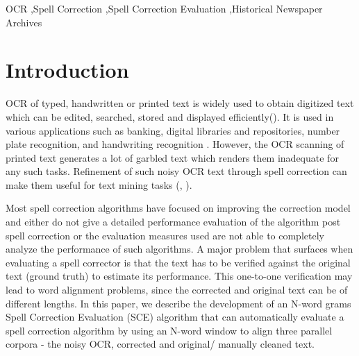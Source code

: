 \documentclass[preprint,11pt]{elsarticle}
\begin{document}
\begin{frontmatter}
\begin{abstract}
\end{abstract}

\begin{keyword}
 OCR \sep Spell Correction \sep Spell Correction Evaluation \sep Historical Newspaper Archives


\end{keyword}

\end{frontmatter}




\section{Introduction}

OCR of typed, handwritten or printed text is widely used to obtain digitized text which can be edited, searched, stored and displayed efficiently(\cite{torget2011mapping,palfray2012logical}). It is used in various applications such as banking, digital libraries \cite{mcmurdo2013vermont} and repositories, number plate recognition, and handwriting recognition \cite{singh2012survey}. However, the OCR scanning of printed text generates a lot of garbled text which renders them inadequate for any such tasks. Refinement of such noisy OCR text through spell correction can make them useful for text mining tasks (\cite{dutta2011learning}, \cite{yang2011topic}).

Most spell correction algorithms have focused on improving the correction model and either do not give a detailed performance evaluation of the algorithm post spell correction or the evaluation measures used are not able to completely analyze the performance of such algorithms.  
A major problem that surfaces when evaluating a spell corrector is that the text has to be verified against the original text (ground truth) to estimate its performance. This one-to-one verification may lead to word alignment problems, since the corrected and original text can be of different lengths.
In this paper, we describe the development of an N-word grams Spell Correction Evaluation (SCE) algorithm that can automatically evaluate a spell correction algorithm by using an N-word window to align three parallel corpora - the noisy OCR, corrected and original/ manually cleaned text. 
\end{document}
